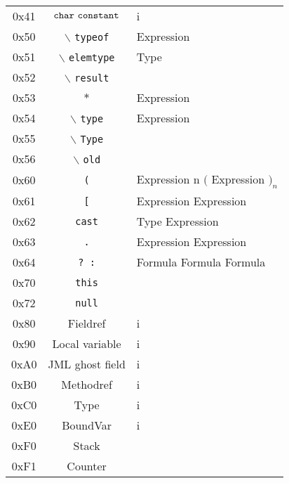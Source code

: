 \begin{appendix}
\begin{center}
\begin{tabular}[t]{|c|c|l|}
0x41 & $\tt{char \ constant}$ & i \\
0x50 & $\backslash$ \texttt{typeof} & Expression \\
0x51 & $\backslash$ \texttt{elemtype} & Type \\
0x52 & $\backslash$ \texttt{result} & \\
0x53 & $\ast$ & Expression \\
0x54 & $\backslash$ \texttt{type} & Expression \\ 
0x55 & $\backslash$ \texttt{Type} & \\ 
0x56 & $\backslash$ \texttt{old} & \\ 
0x60 & \texttt{(} & Expression n $($ Expression $)_n$\\
0x61 & \texttt{[} & Expression Expression \\
0x62 & \texttt{cast} & Type Expression \\
0x63 & \texttt{.}& Expression Expression \\
0x64 & \texttt{? :} & Formula Formula Formula \\
0x70 & \texttt{this} & \\
0x72 & \texttt{null} & \\
0x80 & Fieldref & i \\
0x90 & Local variable & i \\
0xA0 & JML ghost field& i\\
0xB0 & Methodref & i \\
0xC0 & Type & i \\
0xE0 & BoundVar & i \\
0xF0 & Stack \\
0xF1 & Counter \\
\hline
\end{tabular}\\[2 mm]
\end{center}

\end{appendix}


